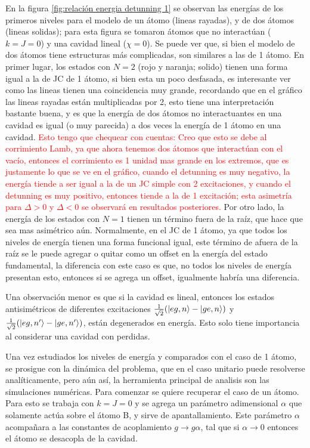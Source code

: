 En la figura \ref{fig:relación energia detunning 1} se observan las energías de los primeros niveles para el modelo de un átomo (lineas rayadas), y de dos átomos (lineas solidas); para esta figura se tomaron átomos que no interactúan ($k=J=0$) y una cavidad lineal ($\chi=0$). Se puede ver que, si bien el modelo de dos átomos tiene estructuras más complicadas, son similares a las de 1 átomo. En primer lugar, los estados con $N=2$ (rojo y naranja; solido) tienen una forma igual a la de JC de 1 átomo, si bien esta un poco desfasada, es interesante ver como las lineas tienen una coincidencia muy grande, recordando que en el gráfico las lineas rayadas están multiplicadas por 2, esto tiene una interpretación bastante buena, y es que la energía de dos átomos no interactuantes en una cavidad es igual (o muy parecida) a dos veces la energía de 1 átomo en una cavidad. \textcolor{red}{Esto tengo que chequear con cuentas: Creo que esto se debe al corrimiento Lamb, ya que ahora tenemos dos átomos que interactúan con el vacío, entonces el corrimiento es 1 unidad mas grande en los extremos, que es justamente lo que se ve en el gráfico, cuando el detunning es muy negativo, la energ\'ia tiende a ser igual a la de un JC simple con 2 excitaciones, y cuando el detunning es muy positivo, entonces tiende a la de 1 excitaci\'on; esta asimetr\'ia para $\Delta>0$ y $\Delta<0$ se observar\'a en resultados posteriores.} Por otro lado, la energ\'ia de los estados con $N=1$ tienen un t\'ermino fuera de la raíz, que hace que sea mas asim\'etrico a\'un. Normalmente, en el JC de 1 átomo, ya que todos los niveles de energía tienen una forma funcional igual, este término de afuera de la raíz se le puede agregar o quitar como un offset en la energía del estado fundamental, la diferencia con este caso es que, no todos los niveles de energía presentan esto, entonces si se agrega un offset, igualmente habría una diferencia. 

Una observación menor es que si la cavidad es lineal, entonces los estados antisimétricos de diferentes excitaciones $\frac{1}{\sqrt{2}}(\ket{eg,n}-\ket{ge,n})$ y $\frac{1}{\sqrt{2}}(\ket{eg,n'}-\ket{ge,n'})$, están degenerados en energía. Esto solo tiene importancia al considerar una cavidad con perdidas.

Una vez estudiados los niveles de energía y comparados con el caso de 1 átomo, se prosigue con la dinámica del problema, que en el caso unitario puede resolverse analíticamente, pero a\'un así, la herramienta principal de analisis son las simulaciones numéricas.
Para comenzar se quiere recuperar el caso de un átomo. Para esto se trabaja con $k=J=0$ y se agrega un parámetro adimensional $\alpha$ que solamente actúa sobre el átomo B, y sirve de apantallamiento. Este parámetro $\alpha$ acompañara a las constantes de acoplamiento $g\rightarrow g\alpha$, tal que si $\alpha \rightarrow 0$ entonces el átomo se desacopla de la cavidad. 

